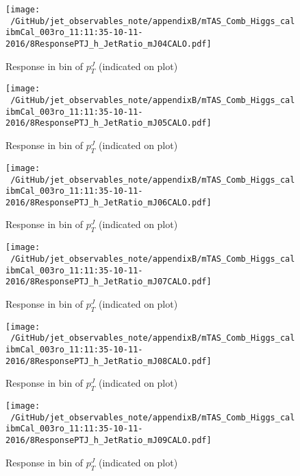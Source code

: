 \begin{figure}

\texttt{[image: ~/GitHub/jet\_observables\_note/appendixB/mTAS\_Comb\_Higgs\_calibmCal\_003ro\_11:11:35-10-11-2016/8ResponsePTJ\_h\_JetRatio\_mJ04CALO.pdf]}
\caption{Response in bin of  $p_{T}^{J}$ (indicated on plot)} 

\end{figure}

\begin{figure}

\texttt{[image: ~/GitHub/jet\_observables\_note/appendixB/mTAS\_Comb\_Higgs\_calibmCal\_003ro\_11:11:35-10-11-2016/8ResponsePTJ\_h\_JetRatio\_mJ05CALO.pdf]}
\caption{Response in bin of  $p_{T}^{J}$ (indicated on plot)} 

\end{figure}

\begin{figure}

\texttt{[image: ~/GitHub/jet\_observables\_note/appendixB/mTAS\_Comb\_Higgs\_calibmCal\_003ro\_11:11:35-10-11-2016/8ResponsePTJ\_h\_JetRatio\_mJ06CALO.pdf]}
\caption{Response in bin of  $p_{T}^{J}$ (indicated on plot)} 

\end{figure}

%
\begin{figure}

\texttt{[image: ~/GitHub/jet\_observables\_note/appendixB/mTAS\_Comb\_Higgs\_calibmCal\_003ro\_11:11:35-10-11-2016/8ResponsePTJ\_h\_JetRatio\_mJ07CALO.pdf]}
\caption{Response in bin of  $p_{T}^{J}$ (indicated on plot)} 

\end{figure}


\begin{figure}

\texttt{[image: ~/GitHub/jet\_observables\_note/appendixB/mTAS\_Comb\_Higgs\_calibmCal\_003ro\_11:11:35-10-11-2016/8ResponsePTJ\_h\_JetRatio\_mJ08CALO.pdf]}
\caption{Response in bin of  $p_{T}^{J}$ (indicated on plot)} 

\end{figure}

\begin{figure}

\texttt{[image: ~/GitHub/jet\_observables\_note/appendixB/mTAS\_Comb\_Higgs\_calibmCal\_003ro\_11:11:35-10-11-2016/8ResponsePTJ\_h\_JetRatio\_mJ09CALO.pdf]}
\caption{Response in bin of  $p_{T}^{J}$ (indicated on plot)} 

\end{figure}

